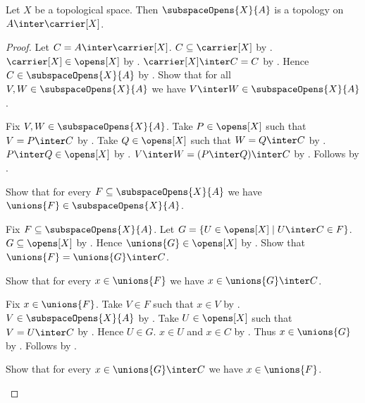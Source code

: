 \begin{theorem}\label{subspace_opens_form_topology}
    Let $X$ be a topological space.
    Then $\subspaceOpens{X}{A}$ is a topology on
        $A\inter\carrier[X]$.
\end{theorem}
\begin{proof}
    Let $C=A\inter\carrier[X]$.
    $C\subseteq\carrier[X]$ by .
    $\carrier[X]\in\opens[X]$ by .
    $\carrier[X]\inter C=C$
        by .
    Hence $C\in\subspaceOpens{X}{A}$
        by .
    Show that for all $V,W\in\subspaceOpens{X}{A}$ we have
        $V\inter W\in\subspaceOpens{X}{A}$.
    \begin{subproof}
        Fix $V,W\in\subspaceOpens{X}{A}$.
        Take $P\in\opens[X]$ such that $V=P\inter C$
            by .
        Take $Q\in\opens[X]$ such that $W=Q\inter C$
            by .
        $P\inter Q\in\opens[X]$ by .
        $V\inter W=(P\inter Q)\inter C$
            by .
        Follows by .
    \end{subproof}
    Show that for every $F\subseteq\subspaceOpens{X}{A}$ we have
        $\unions{F}\in\subspaceOpens{X}{A}$.
    \begin{subproof}
        Fix $F\subseteq\subspaceOpens{X}{A}$.
        Let $G=\{U\in\opens[X]\mid U\inter C\in F\}$.
        $G\subseteq\opens[X]$ by .
        Hence $\unions{G}\in\opens[X]$ by .
        Show that $\unions{F}=\unions{G}\inter C$.
        \begin{subproof}
            Show that for every $x\in\unions{F}$ we have
                $x\in\unions{G}\inter C$.
            \begin{subproof}
                Fix $x\in\unions{F}$.
                Take $V\in F$ such that $x\in V$
                    by .
                $V\in\subspaceOpens{X}{A}$ by .
                Take $U\in\opens[X]$ such that $V=U\inter C$
                    by .
                Hence $U\in G$.
                $x\in U$ and $x\in C$ by .
                Thus $x\in\unions{G}$ by .
                Follows by .
            \end{subproof}
            Show that for every $x\in\unions{G}\inter C$ we have
                $x\in\unions{F}$.
            \begin{subproof}

\end{subproof}
\end{subproof}
\end{subproof}
\end{proof}
